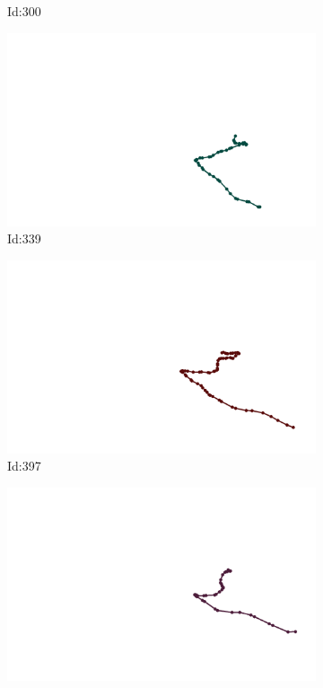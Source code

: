 \documentclass[12pt,twoside]{report}
\begin{document}
\begin{figure}
\begin{subfigure}[b]{0.20\textwidth}
\caption{Id:300}
\end{subfigure}
\begin{subfigure}[b]{0.20\textwidth}
\centering
\includegraphics[width=\textwidth]{../trajectories/339.png}
\caption{Id:339}
\end{subfigure}
\begin{subfigure}[b]{0.20\textwidth}
\centering
\includegraphics[width=\textwidth]{../trajectories/397.png}
\caption{Id:397}
\end{subfigure}
\begin{subfigure}[b]{0.20\textwidth}
\centering
\includegraphics[width=\textwidth]{../trajectories/421.png}

\end{subfigure}
\end{figure}
\end{document}
